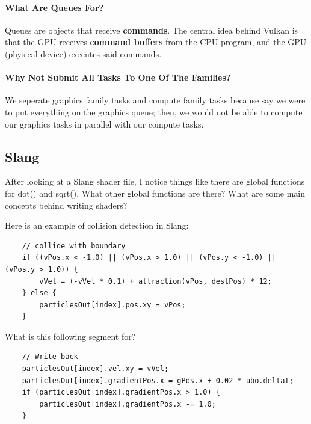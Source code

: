 \documentclass{article}
\begin{document}
\paragraph*{What Are Queues
For?}

Queues are objects that receive \textbf{commands}. The central idea behind
Vulkan is that the GPU receives \textbf{command buffers} from the CPU
program, and the GPU (physical device) executes said commands.

\paragraph*{Why Not Submit All Tasks To One Of The
Families?}

We seperate graphics family tasks and compute family tasks because
say we were to put everything on the graphics queue; then, we would
not be able to compute our graphics tasks in parallel with our compute tasks.

\subsection*{Slang}

\par After looking at a Slang shader file, I notice things like there
are global functions for dot() and sqrt(). What other global
functions are there? What are some main concepts behind writing shaders?

\par Here is an example of collision detection in Slang:
\begin{verbatim}
    // collide with boundary
    if ((vPos.x < -1.0) || (vPos.x > 1.0) || (vPos.y < -1.0) || (vPos.y > 1.0)) {
        vVel = (-vVel * 0.1) + attraction(vPos, destPos) * 12;
    } else {
        particlesOut[index].pos.xy = vPos;
    }
\end{verbatim}

\par What is this following segment for?
\begin{verbatim}
    // Write back
    particlesOut[index].vel.xy = vVel;
    particlesOut[index].gradientPos.x = gPos.x + 0.02 * ubo.deltaT;
    if (particlesOut[index].gradientPos.x > 1.0) {
        particlesOut[index].gradientPos.x -= 1.0;
    }
\end{verbatim}
\end{document}
